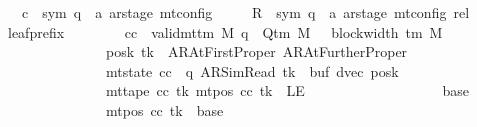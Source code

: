 \begin{isabellebody}
\ \ \ \ \ c{\isacharprime}{\kern0pt}\ {\isacharcolon}{\kern0pt}{\isacharcolon}{\kern0pt}\ {\isachardoublequoteopen}{\isacharparenleft}{\kern0pt}sym{}{\isacharcomma}{\kern0pt}\ {\isacharprime}{\kern0pt}q\ {\isasymtimes}\ {\isacharprime}{\kern0pt}a\ ar{\isacharunderscore}{\kern0pt}stage{\isacharparenright}{\kern0pt}\ mt{\isacharunderscore}{\kern0pt}config{\isachardoublequoteclose}\isanewline
\ \ \ \ \ R{\isacharprime}{\kern0pt}\ {\isacharcolon}{\kern0pt}{\isacharcolon}{\kern0pt}\ {\isachardoublequoteopen}{\isacharparenleft}{\kern0pt}sym{}{\isacharcomma}{\kern0pt}\ {\isacharprime}{\kern0pt}q\ {\isasymtimes}\ {\isacharprime}{\kern0pt}a\ ar{\isacharunderscore}{\kern0pt}stage{\isacharparenright}{\kern0pt}\ mt{\isacharunderscore}{\kern0pt}config\ rel{\isachardoublequoteclose}\isanewline
\ \ \ leaf{\isacharunderscore}{\kern0pt}prefix{\isacharcolon}{\kern0pt}\isanewline
\ \ \ \ \ \ \ \ {\isachardoublequoteopen}{\isasymAnd}cc{\isachardot}{\kern0pt}\ {\isasymlbrakk}\ valid{\isacharunderscore}{\kern0pt}mttm\ M{\isacharsemicolon}{\kern0pt}\ q\ {\isasymin}\ Q{\isacharunderscore}{\kern0pt}tm\ M{\isacharsemicolon}{\kern0pt}\ {}\ {\isasymle}\ block{\isacharunderscore}{\kern0pt}width\ {\isacharparenleft}{\kern0pt}{\isasymGamma}{\isacharunderscore}{\kern0pt}tm\ M{\isacharparenright}{\kern0pt}{\isacharsemicolon}{\kern0pt}\isanewline
\ \ \ \ \ \ \ \ \ \ \ \ \ \ \ \ \ posk\ tk\ {\isasymin}\ {\isacharbraceleft}{\kern0pt}AR{\isacharunderscore}{\kern0pt}AtFirstProper{\isacharcomma}{\kern0pt}\ AR{\isacharunderscore}{\kern0pt}AtFurtherProper{\isacharbraceright}{\kern0pt}{\isacharsemicolon}{\kern0pt}\isanewline
\ \ \ \ \ \ \ \ \ \ \ \ \ \ \ \ \ mt{\isacharunderscore}{\kern0pt}state\ cc\ {\isacharequal}{\kern0pt}\ {\isacharparenleft}{\kern0pt}q{\isacharcomma}{\kern0pt}\ AR{\isacharunderscore}{\kern0pt}SimRead{\isacharcomma}{\kern0pt}\ tk{\isacharcomma}{\kern0pt}\ {}{\isacharcomma}{\kern0pt}\ buf{\isacharcomma}{\kern0pt}\ dvec{\isacharcomma}{\kern0pt}\ posk{\isacharparenright}{\kern0pt}{\isacharsemicolon}{\kern0pt}\isanewline
\ \ \ \ \ \ \ \ \ \ \ \ \ \ \ \ \ mt{\isacharunderscore}{\kern0pt}tape\ cc\ tk\ {\isacharparenleft}{\kern0pt}mt{\isacharunderscore}{\kern0pt}pos\ cc\ tk{\isacharparenright}{\kern0pt}\ {\isasymnoteq}\ LE{}{\isacharsemicolon}{\kern0pt}\isanewline
\ \ \ \ \ \ \ \ \ \ \ \ \ \ \ \ \ {}\ {\isacharless}{\kern0pt}\ base{\isacharsemicolon}{\kern0pt}\isanewline
\ \ \ \ \ \ \ \ \ \ \ \ \ \ \ \ \ mt{\isacharunderscore}{\kern0pt}pos\ cc\ tk\ {\isacharequal}{\kern0pt}\ base{\isacharsemicolon}{\kern0pt}\isanewline

\end{isabellebody}
